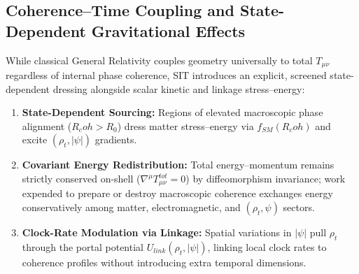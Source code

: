 \documentclass[american,11pt,letterpaper]{article}
\newcommand{\Rcoh}{R_{\mathrm{coh}}}
\def\mathrm#1{#1}%
\def\Rcoh{R_coh}%
\begin{document}
\subsection{Coherence--Time Coupling and State-Dependent Gravitational Effects}

While classical General Relativity couples geometry universally to total $T_{\mu\nu}$ regardless of internal phase coherence, SIT introduces an explicit, screened state-dependent dressing alongside scalar kinetic and linkage stress--energy:
\begin{enumerate}[leftmargin=2em]
  \item \textbf{State-Dependent Sourcing:} Regions of elevated macroscopic phase alignment ($\Rcoh > R_0$) dress matter stress--energy via $f_{\mathrm{SM}}(\Rcoh)$ and excite $(\rho_t, |\psi|)$ gradients.
  \item \textbf{Covariant Energy Redistribution:} Total energy--momentum remains strictly conserved on-shell ($\nabla^\mu T_{\mu\nu}^{\mathrm{tot}} = 0$) by diffeomorphism invariance; work expended to prepare or destroy macroscopic coherence exchanges energy conservatively among matter, electromagnetic, and $(\rho_t, \psi)$ sectors.
  \item \textbf{Clock-Rate Modulation via Linkage:} Spatial variations in $|\psi|$ pull $\rho_t$ through the portal potential $U_{\mathrm{link}}(\rho_t, |\psi|)$, linking local clock rates to coherence profiles without introducing extra temporal dimensions.
\end{enumerate}
\end{document}

